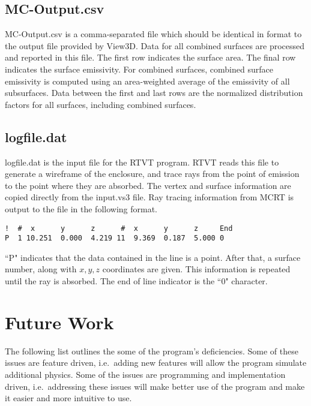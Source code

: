 \documentclass{article}
\begin{document}
\subsection{MC-Output.csv}

MC-Output.csv is a comma-separated file which should be identical in format to the output file provided by View3D. Data for all combined surfaces are processed and reported in this file. The first row indicates the surface area. The final row indicates the surface emissivity. For combined surfaces, combined surface emissivity is computed using an area-weighted average of the emissivity of all subsurfaces. Data between the first and last rows are the normalized distribution factors for all surfaces, including combined surfaces.

\subsection{logfile.dat}

logfile.dat is the input file for the RTVT program. RTVT reads this file to generate a wireframe of the enclosure, and trace rays from the point of emission to the point where they are absorbed. The vertex and surface information are copied directly from the input.vs3 file. Ray tracing information from MCRT is output to the file in the following format.

\begin{lstlisting}
!  #  x      y      z      #  x      y      z     End
P  1 10.251  0.000  4.219 11  9.369  0.187  5.000 0
\end{lstlisting}

``P" indicates that the data contained in the line is a point. After that, a surface number, along with $x, y, z$ coordinates are given. This information is repeated until the ray is absorbed. The end of line indicator is the ``0" character.

\section{Future Work}
\label{sec:future work}

The following list outlines the some of the program's deficiencies. Some of these issues are feature driven, i.e.~adding new features will allow the program simulate additional physics. Some of the issues are programming and implementation driven, i.e.~addressing these issues will make better use of the program and make it easier and more intuitive to use.
\end{document}
